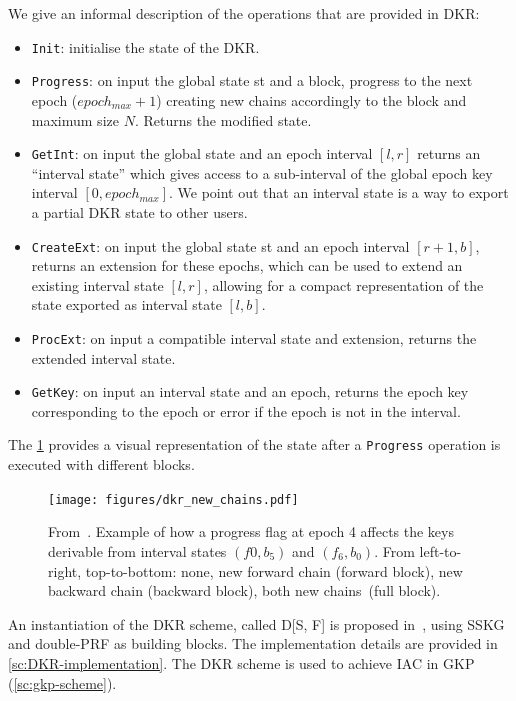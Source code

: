 We give an informal description of the operations that are provided in DKR:
\begin{itemize}
    \item \texttt{Init}: initialise the state of the DKR.
    \item \texttt{Progress}: on input the global state st and a block, progress to the next epoch ($epoch_{max} + 1$) creating new chains accordingly to the block and maximum size $N$. Returns the modified state.
    \item \texttt{GetInt}: on input the global state and an epoch interval $[l, r]$ returns an ``interval state'' which gives access to a sub-interval of the global epoch key interval $[0, epoch_{max}]$. We point out that an interval state is a way to export a partial DKR state to other users.
    \item \texttt{CreateExt}: on input the global state st and an epoch interval $[r + 1, b]$, returns
    an extension for these epochs, which can be used to extend an existing interval state $[l, r]$, allowing for a compact representation of the state exported as interval state $[l, b]$.
    \item \texttt{ProcExt}: on input a compatible interval state and extension, returns the
    extended interval state.
    \item \texttt{GetKey}: on input an interval state and an epoch, returns the epoch key corresponding to the epoch or error if the epoch is not in the interval.
\end{itemize}

The \cref{fig:dkr-new-chains} provides a visual representation of the 
state after a \texttt{Progress} operation is executed with different blocks.

\begin{figure}[t]
	\centering
	\texttt{[image: figures/dkr\_new\_chains.pdf]}
	\caption{
        From~\cite{GKP}.
		Example of how a progress flag at epoch 4 affects the keys derivable from interval states $(f{0}, b_{5})$ and $(f_{6}, b_{0})$.
		From left-to-right, top-to-bottom: none, new forward chain (forward block), new backward chain (backward block), both new chains~(full block). 
        \label{fig:dkr-new-chains}}
\end{figure}

An instantiation of the DKR scheme, called D[S, F] is proposed in~\cite{GKP},
using SSKG and double-PRF as building blocks. The implementation
details are provided in \cref{sc:DKR-implementation}.
The DKR scheme is used to achieve IAC in GKP (\cref{sc:gkp-scheme}).


